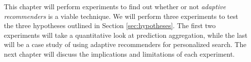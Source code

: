 \label{chap:results}

This chapter will perform experiments to find out whether or not
\emph{adaptive recommenders} is a viable technique.
We will perform three experiments to 
test the three hypotheses outlined in Section 
\ref{sec:hypotheses}.
The first two experiments will take a quantitative look
at prediction aggregation, while the last 
will be a case study of using adaptive recommenders
for personalized search.
The next chapter will discuss the implications 
and limitations of each experiment.







%

